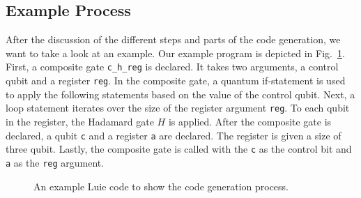 \subsection{Example Process}
After the discussion of the different steps and parts of the code generation, we want to take a look at an example. Our example program is depicted in Fig.~\ref{fig:codeGen_source_example}. First, a composite gate \texttt{c\_h\_reg} is declared. It takes two arguments, a control qubit and a register \texttt{reg}. In the composite gate, a quantum if-statement is used to apply the following statements based on the value of the control qubit. Next, a loop statement iterates over the size of the register argument \texttt{reg}. To each qubit in the register, the Hadamard gate $H$ is applied. After the composite gate is declared, a qubit \texttt{c} and a register \texttt{a} are declared. The register is given a size of three qubit. Lastly, the composite gate is called with the \texttt{c} as the control bit and \texttt{a} as the \texttt{reg} argument. 

\begin{figure}
    \centering
    
    \caption{An example Luie code to show the code generation process.}
    \label{fig:codeGen_source_example}
\end{figure}

